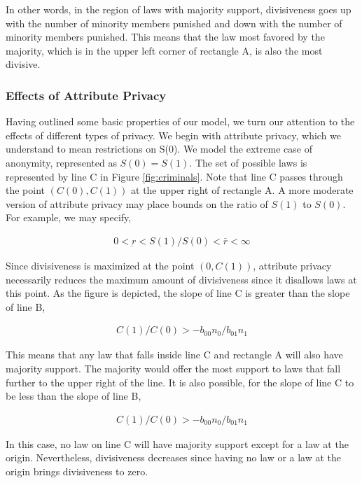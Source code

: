 In other words, in the region of laws with majority support, divisiveness goes up with the number of minority members punished and down with the number of minority members punished.  This means that the law most favored by the majority, which is in the upper left corner of rectangle A, is also the most divisive.

\subsubsection{Effects of Attribute Privacy}

Having outlined some basic properties of our model, we turn our attention to the effects of different types of privacy.  We begin with attribute privacy, which we understand to mean restrictions on S(0).  We model the extreme case of anonymity, represented as $S(0) = S(1)$.  The set of possible laws is represented by line C in Figure \ref{fig:criminals}.  Note that line C passes through the point $ \left(C(0), C(1) \right)$ at the upper right of rectangle A.  A more moderate version of attribute privacy may place bounds on the ratio of $S(1)$ to $S(0)$.  For example, we may specify,

\begin{align}
0 < \underbar r < S(1) /S(0) < \bar r < \infty
\end{align}

Since divisiveness is maximized at the point $ \left(0, C(1) \right)$, attribute privacy necessarily reduces the maximum amount of divisiveness since it disallows laws at this point.  As the figure is depicted, the slope of line C is greater than the slope of line B,

\begin{align}
C(1)/C(0) > - b_{00}n_0 / b_{01}n_1 
\end{align}

This means that any law that falls inside line C and rectangle A will also have majority support.  The majority would offer the most support to laws that fall further to the upper right of the line.  It is also possible, for the slope of line C to be less than the slope of line B,

\begin{align}
C(1)/C(0) > - b_{00}n_0 / b_{01}n_1 
\end{align}

In this case, no law on line C will have majority support except for a law at the origin.  Nevertheless, divisiveness decreases since having no law or a law at the origin brings divisiveness to zero.


